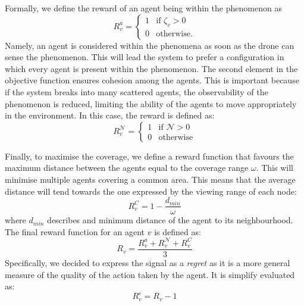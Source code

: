 \documentclass[conference]{IEEEtran}
\begin{document}
Formally, we define the reward of an agent being within the phenomenon as
 \begin{equation*}
 R^a_{v} = \begin{cases}
  1 & \text{if } \zeta_v > 0 \\
  0 & \text{otherwise.} 
 \end{cases}
 \end{equation*}
Namely, an agent is considered within the phenomena as soon as the drone can sense the phenomenon.
%
This will lead the system to prefer a configuration in which every agent is present within the phenomenon.
%
The second element in the objective function ensures cohesion among the agents. 
 This is important because if the system breaks into many scattered agents, 
 the observability of the phenomenon is reduced, 
 limiting the ability of the agents to move appropriately in the environment.
 In this case, the reward is defined as:
 \begin{equation*}
 R^{\mathcal{N}}_{v} = \begin{cases}
  1 & \text{if } \mathcal{N} > 0 \\
  0 & \text{otherwise} 
 \end{cases}
 \end{equation*}
 
Finally, to maximise the coverage, 
  we define a reward function that favours the maximum distance between the agents
  equal to the coverage range $\omega$. This will minimise multiple agents covering a common area.
%
This means that the average distance will tend towards the one expressed by the viewing range of each node:
% 
\begin{equation*}
R^{C}_{v} = 1 - \frac{d_{min}}{\omega}
\end{equation*}
where $d_{min}$ describes and minimum distance of the agent to its neighbourhood. 
%
The final reward function for an agent $v$ is defined as:
\begin{equation*}
R_{v} = \frac{R^a_{v} + R^{\mathcal{N}}_{v} + R^{C}_{v}}{3}
\end{equation*}
Specifically, we decided to express the signal as a \emph{regret}
  as it is a more general measure of the quality of the action taken by the agent.
It is simplify evaluated as:
\begin{equation*}
R^e_{v} = R_v - 1
\end{equation*}
%
\end{document}
